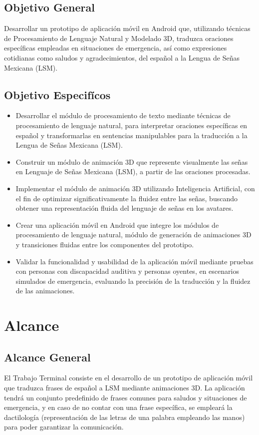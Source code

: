 \subsection{Objetivo General}
Desarrollar un prototipo de aplicación móvil en Android que, utilizando técnicas de Procesamiento de Lenguaje Natural y Modelado 3D, traduzca oraciones específicas empleadas en situaciones de emergencia, así como expresiones cotidianas como saludos y agradecimientos, del español a la Lengua de Señas Mexicana (LSM).

\subsection{Objetivo Especifícos}
\begin{itemize}
 \item Desarrollar el módulo de procesamiento de texto mediante técnicas de procesamiento de lenguaje natural, para interpretar oraciones específicas en español y transformarlas en sentencias manipulables para la traducción a la Lengua de Señas Mexicana (LSM).
    \item Construir un módulo de animación 3D que represente visualmente las señas en Lenguaje de Señas Mexicana (LSM), a partir de las oraciones procesadas.
    \item Implementar el módulo de animación 3D utilizando Inteligencia Artificial, con el fin de optimizar significativamente la fluidez entre las señas, buscando obtener una representación fluida del lenguaje de señas en los avatares.
    \item Crear una aplicación móvil en Android que integre los módulos de procesamiento de lenguaje natural, módulo de generación de animaciones 3D y transiciones fluidas entre los componentes del prototipo.
    \item Validar la funcionalidad y usabilidad de la aplicación móvil mediante pruebas con personas con discapacidad auditiva y personas oyentes, en escenarios simulados de emergencia, evaluando la precisión de la traducción y la fluidez de las animaciones.
\end{itemize}

\section{Alcance}
\subsection{Alcance General}
El Trabajo Terminal consiste en el desarrollo de un prototipo de aplicación móvil que traduzca frases de español a LSM mediante animaciones 3D. La aplicación tendrá un conjunto predefinido de frases comunes para saludos y situaciones de emergencia, y en caso de no contar con una frase específica, se empleará la dactilología (representación de las letras de una palabra empleando las manos) para poder garantizar la comunicación.

